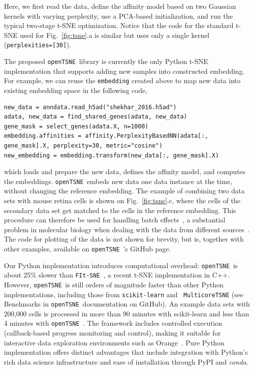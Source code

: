 \documentclass{bioinfo}
\newcommand{\opentsne}[0]{{\tt openTSNE}\ }
\begin{document}
\noindent Here, we first read the data, define the affinity model based on two
Gaussian kernels with varying perplexity, use a PCA-based initialization, and run
the typical two-stage t-SNE optimization. Notice that the code for the standard
t-SNE used for Fig.~\ref{fig:tsne}.a is similar but uses only a single kernel
({\tt perplexities=[30]}).

The proposed \opentsne library is currently the only Python t-SNE
implementation that supports adding new samples into constructed embedding. For
example, we can reuse the {\tt embedding} created above to map new data into
existing embedding space in the following code,

\begin{lstlisting}
new_data = anndata.read_h5ad("shekhar_2016.h5ad")
adata, new_data = find_shared_genes(adata, new_data)
gene_mask = select_genes(adata.X, n=1000)
embedding.affinities = affinity.PerplexityBasedNN(adata[:, gene_mask].X, perplexity=30, metric="cosine")
new_embedding = embedding.transform(new_data[:, gene_mask].X)
\end{lstlisting}

\noindent which loads and prepare the new data, defines the affinity model, and
computes the embeddings. \opentsne embeds new data one data instance at the
time, without changing the reference embedding. The example of combining two
data sets with mouse retina cells is shown on Fig.~\ref{fig:tsne}.c, where the
cells of the secondary data set get matched to the cells in the reference
embedding. This
procedure can therefore be used for handling batch effects~\cite{Pavlin2019-DS}, a substantial
problem in molecular biology when dealing with the data from different
sources~\cite{batch-effects}. The code for plotting of the data is not shown
for brevity, but is, together with other examples, available on {\opentsne}'s
GitHub page. 

Our Python implementation introduces computational overhead: \opentsne is about
25\% slower than {\tt FIt-SNE}~\citep{fi_tsne}, a recent t-SNE implementation
in C++. However, \opentsne is still orders of magnitude faster than other
Python implementations, including those from {\tt scikit-learn} and {\tt
MulticoreTSNE} (see Benchmarks in \opentsne documentation on GitHub). An example data sets with 200,000 cells
is processed in more than 90 minutes with scikit-learn and less than 4 minutes with \opentsne.
The framework includes controlled execution (callback-based progress monitoring and
control), making it suitable for interactive data exploration environments such
as Orange~\cite{scorange}. Pure Python implementation offers distinct
advantages that include integration with Python's rich data science
infrastructure and ease of installation through PyPI and {\em conda}.
\end{document}
